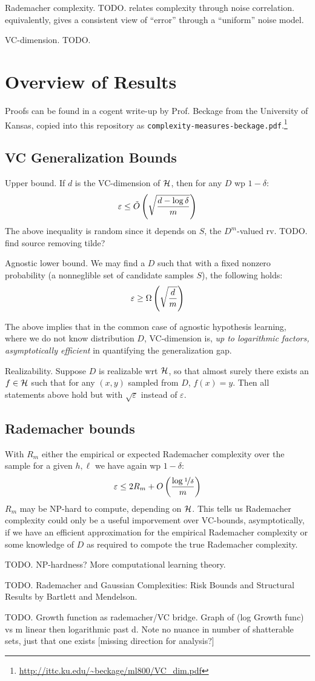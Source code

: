 \documentclass{article}
\begin{document}
Rademacher complexity. TODO. relates complexity through noise correlation. equivalently, gives a consistent view of ``error'' through a ``uniform'' noise model.

VC-dimension. TODO.

\section{Overview of Results}

Proofs can be found in a cogent write-up by Prof. Beckage from the University of Kansas, copied into this repository as \texttt{complexity-measures-beckage.pdf}.\footnote{\url{http://ittc.ku.edu/~beckage/ml800/VC_dim.pdf}}

\subsection{VC Generalization Bounds}

Upper bound. If $d$ is the VC-dimension of ${\mathcal{H}}$, then for any $D$ wp $1-\delta$:
$$
\varepsilon\le \tilde{O}\left({\sqrt{\frac{d-\log \delta}{m}}}\right)
$$
The above inequality is random since it depends on $S$, the $D^m$-valued rv. TODO. find source removing tilde?

Agnostic lower bound. We may find a $D$ such that with a fixed nonzero probability (a nonneglible set of candidate samples $S$), the following holds:
$$
\varepsilon\ge \Omega\left({\sqrt{\frac{d}{m}}}\right)
$$

The above implies that in the common case of agnostic hypothesis learning, where we do not know distribution $D$, VC-dimension is, \textit{up to logarithmic factors, asymptotically efficient} in quantifying the generalization gap.

Realizability. Suppose $D$ is realizable wrt ${\mathcal{H}}$, so that almost surely there exists an $f\in{\mathcal{H}}$ such that for any $(x,y)$ sampled from $D$, $f(x)=y$. Then all statements above hold but with $\sqrt{\varepsilon}$ instead of $\varepsilon$.


\subsection{Rademacher bounds}

With $R_m$ either the empirical or expected Rademacher complexity over the sample for a given $h,\ell$ we have again wp $1-\delta$:
$$
\varepsilon\le 2R_m+O\left({\frac{\log\nicefrac{1}{\delta}}{m}}\right)
$$
$R_m$ may be NP-hard to compute, depending on ${\mathcal{H}}$. This tells us Rademacher complexity could only be a useful imporvement over VC-bounds, asymptotically, if we have an efficient approximation for the empirical Rademacher complexity or some knowledge of $D$ as required to compote the true Rademacher complexity.

TODO. NP-hardness? More computational learning theory.

TODO. Rademacher and Gaussian Complexities: Risk Bounds and Structural Results by Bartlett and Mendelson.

TODO. Growth function as rademacher/VC bridge. Graph of (log Growth func) vs m linear then logarithmic past d. Note no nuance in number of shatterable sets, just that one exists [missing direction for analysis?]
\end{document}
